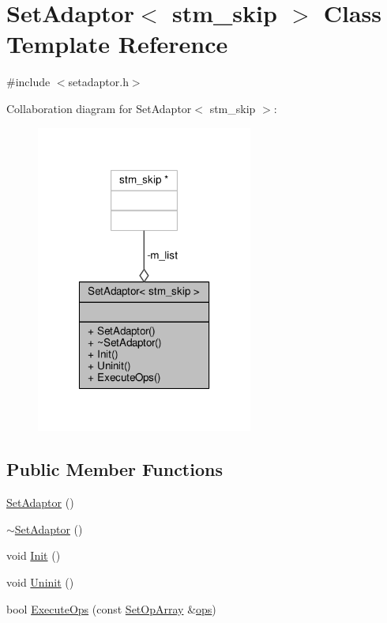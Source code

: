 \hypertarget{classSetAdaptor_3_01stm__skip_01_4}{\section{Set\-Adaptor$<$ stm\-\_\-skip $>$ Class Template Reference}
\label{classSetAdaptor_3_01stm__skip_01_4}
}


{\ttfamily \#include $<$setadaptor.\-h$>$}



Collaboration diagram for Set\-Adaptor$<$ stm\-\_\-skip $>$\-:
\nopagebreak
\begin{figure}[H]
\begin{center}
\leavevmode
\includegraphics[width=202pt]{classSetAdaptor_3_01stm__skip_01_4__coll__graph}
\end{center}
\end{figure}
\subsection*{Public Member Functions}
\begin{DoxyCompactItemize}
\item 
\hyperlink{classSetAdaptor_3_01stm__skip_01_4_acfb0c3f8dd7da801bdafb4ff1de8ba3e}{Set\-Adaptor} ()
\item 
\hyperlink{classSetAdaptor_3_01stm__skip_01_4_a2507a030fd63806e44bd3711757c0a49}{$\sim$\-Set\-Adaptor} ()
\item 
void \hyperlink{classSetAdaptor_3_01stm__skip_01_4_a65c17466b11941b5b7878438346bf53f}{Init} ()
\item 
void \hyperlink{classSetAdaptor_3_01stm__skip_01_4_a5638dede6218df09523e548fc467c67e}{Uninit} ()
\item 
bool \hyperlink{classSetAdaptor_3_01stm__skip_01_4_ade829499ee93121b12f7acdeda62e847}{Execute\-Ops} (const \hyperlink{setadaptor_8h_a7af6ba4d94b446744e0e49accfb08e24}{Set\-Op\-Array} \&\hyperlink{stmskip_8cc_a91ee67dbc899b78fabcd2bfc4643d307}{ops})
\end{DoxyCompactItemize}
